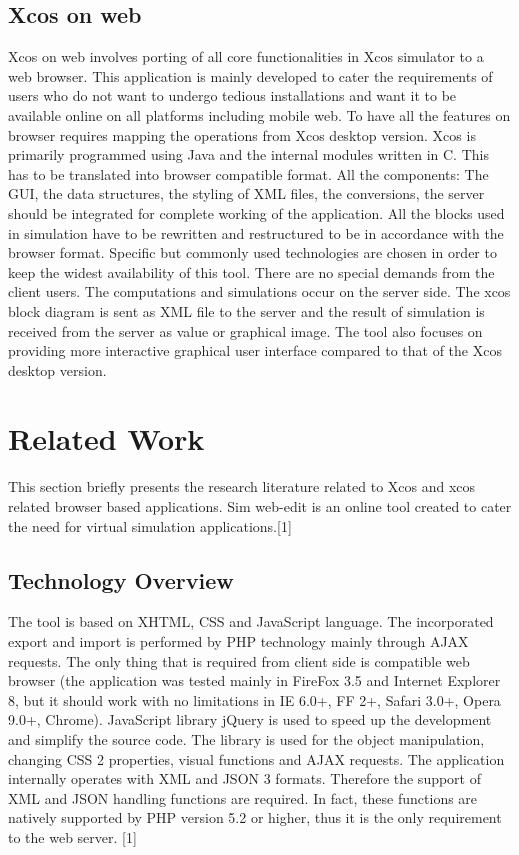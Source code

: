 \documentclass[conference]{IEEEtran}
\begin{document}
\subsection{Xcos on web}
Xcos on web involves porting of all core functionalities in Xcos simulator to a web browser. This application is mainly developed to cater the requirements of users who do not want to undergo tedious installations and want it to be available online on all platforms including mobile web. To have all the features on browser requires mapping the operations from Xcos desktop version. Xcos is primarily programmed using Java and the internal modules written in C. This has to be translated into browser compatible format. All the components: The GUI, the data structures, the styling of XML files, the conversions, the server should be integrated for complete working of the application. All the blocks used in simulation have to be rewritten and restructured to be in accordance with the browser format. Specific but commonly used technologies are chosen in order to keep the widest availability of this tool. There are no special demands from the client users. The computations and simulations occur on the server side. The xcos block diagram is sent as XML file to the server and the result of simulation is received from the server as value or graphical image. The tool also focuses on providing more interactive graphical user interface compared to that of the Xcos desktop version.

\section{Related Work}
This section briefly presents the research literature related to Xcos and xcos related browser based applications.
Sim web-edit is an online tool created to cater the need for virtual simulation applications.[1]

\subsection{Technology Overview}
The tool is based on XHTML, CSS and JavaScript
language. The incorporated export and import is performed
by PHP technology mainly through AJAX requests. The only thing that is required from client side is compatible web browser (the application was tested mainly in FireFox 3.5 and Internet Explorer 8, but it should work with no limitations in IE 6.0+, FF 2+, Safari 3.0+, Opera 9.0+,
Chrome). JavaScript library jQuery is used to speed up the development
and simplify the source code. The library is used for the
object manipulation, changing CSS 2 properties, visual
functions and AJAX requests. The application internally operates with XML and JSON 3 formats. Therefore the support of XML and JSON handling
functions are required. In fact, these functions are natively
supported by PHP version 5.2 or higher, thus it is the only
requirement to the web server. [1]
\end{document}
